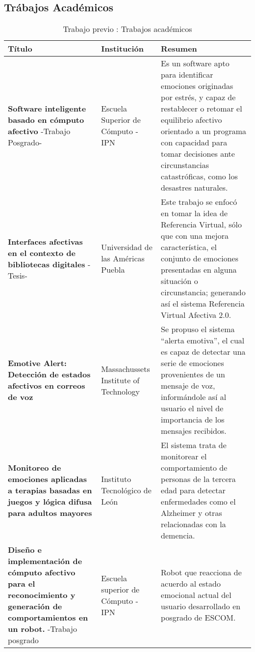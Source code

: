     \subsection{Trábajos Académicos}
		\begin{table}[H]
			\centering
				
				\begin{tabularx}{\textwidth}{|p{30mm}|p{25mm}|X|}


					\hline
					Título & Institución & Resumen\\
					\hline
					\hline
					{\bfseries Software inteligente basado en cómputo afectivo} -Trabajo Posgrado- 
					& Escuela Superior de Cómputo - IPN
					& Es un software apto para identificar emociones originadas por estrés, y capaz de restablecer o retomar el equilibrio afectivo orientado a un programa con capacidad para tomar decisiones ante circunstancias catastróficas, como los desastres naturales.
					\\
					\hline
					{\bfseries Interfaces afectivas en el contexto de bibliotecas digitales} -Tesis- 
					& Universidad de las Américas Puebla
					& Este trabajo se enfocó en tomar la idea de Referencia Virtual, sólo que con una mejora característica, el conjunto de emociones presentadas en alguna situación o circunstancia; generando así el sistema Referencia Virtual Afectiva 2.0.
					\\
					\hline
					{\bfseries Emotive Alert: Detección de estados afectivos en correos de voz}
					& Massachussets Institute of Technology
					& Se propuso el sistema “alerta emotiva”, el cual es capaz de detectar una serie de emociones provenientes de un mensaje de voz, informándole así al usuario el nivel de importancia de los mensajes recibidos.
					\\
					\hline
					{\bfseries Monitoreo de emociones aplicadas a terapias basadas en juegos y lógica difusa para adultos mayores}
					& Instituto Tecnológico de León
					& El sistema trata de monitorear el comportamiento de personas de la tercera edad para detectar enfermedades como el Alzheimer y otras relacionadas con la demencia.
					\\
					\hline
					{\bfseries Diseño e implementación de cómputo afectivo para el reconocimiento y generación de comportamientos en un robot.} -Trabajo posgrado
					& Escuela superior de Cómputo - IPN
					& Robot que reacciona de acuerdo al estado emocional actual del usuario desarrollado en posgrado de ESCOM.
					\\
					\hline
				\end{tabularx}
				
			\caption{Trabajo previo : Trabajos académicos}
		\end{table}

